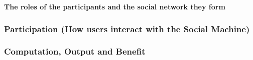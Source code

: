 \documentclass{sig-alternate}
\begin{document}
{\bf The roles of the participants and the social network they form}

\subsubsection{Participation (How users interact with the Social Machine)}



\subsubsection{Computation, Output and Benefit}



%
\end{document}
